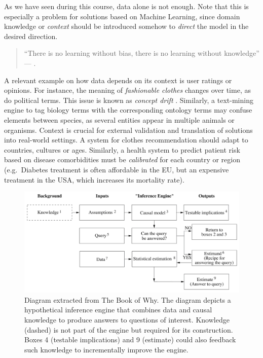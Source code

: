 \documentclass[
]{book}
\begin{document}
As we have seen during this course, data alone is not enough. Note that this is especially a problem for solutions based on Machine Learning, since domain knowledge or \emph{context} should be introduced somehow to \emph{direct} the model in the desired direction.

\begin{quote}
``There is no learning without bias, there is no learning without knowledge'' --- \citep{skansi2020guide} \citep{domingos2015master}.
\end{quote}

A relevant example on how data depends on its context is user ratings or opinions. For instance, the meaning of \emph{fashionable clothes} changes over time, as do political terms. This issue is known as \emph{concept drift} \citep{kubat2017introduction}. Similarly, a text-mining engine to tag biology terms with the corresponding ontology terms may confuse elements between species, as several entities appear in multiple animals or organisms. Context is crucial for external validation and translation of solutions into real-world settings. A system for clothes recommendation should adapt to countries, cultures or ages. Similarly, a health system to predict patient risk based on disease comorbidities must be \emph{calibrated} for each country or region (e.g.~Diabetes treatment is often affordable in the EU, but an expensive treatment in the USA, which increases its mortality rate).

\begin{figure}

{\centering \includegraphics[width=0.9\linewidth]{Figures/jpearl_inference_engine} 

}

\caption{Diagram extracted from The Book of Why. The diagram depicts a hypothetical inference engine that combines data and causal knowledge to produce answers to questions of interest. Knowledge (dashed) is not part of the engine but required for its construction. Boxes 4 (testable implications) and 9 (estimate) could also feedback such knowledge to incrementally improve the engine.}\label{fig:inference-engine}
\end{figure}
\end{document}
